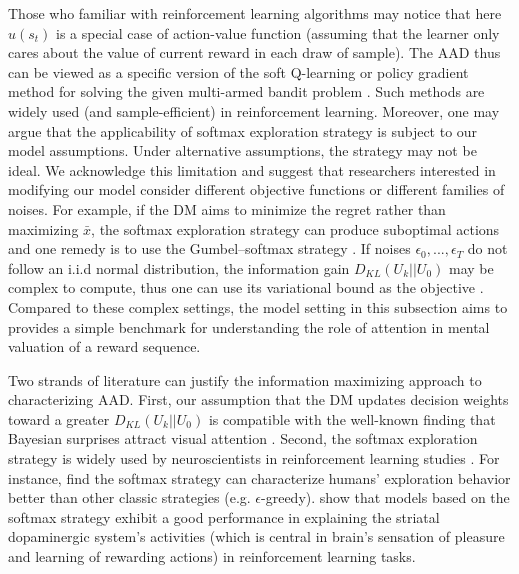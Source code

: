 \documentclass[
  12pt,
]{article}
\begin{document}
Those who familiar with reinforcement learning algorithms may notice
that here \(u(s_t)\) is a special case of action-value function
(assuming that the learner only cares about the value of current reward
in each draw of sample). The AAD thus can be viewed as a specific
version of the soft Q-learning or policy gradient method for solving the
given multi-armed bandit problem
\citep{haarnoja2017reinforcement, schulman2017equivalence}. Such methods
are widely used (and sample-efficient) in reinforcement learning.
Moreover, one may argue that the applicability of softmax exploration
strategy is subject to our model assumptions. Under alternative
assumptions, the strategy may not be ideal. We acknowledge this
limitation and suggest that researchers interested in modifying our
model consider different objective functions or different families of
noises. For example, if the DM aims to minimize the regret rather than
maximizing \(\bar{x}\), the softmax exploration strategy can produce
suboptimal actions and one remedy is to use the Gumbel--softmax strategy
\citep{cesa2017boltzmann}. If noises \(\epsilon_0,...,\epsilon_T\) do
not follow an i.i.d normal distribution, the information gain
\(D_{KL}(U_k||U_0)\) may be complex to compute, thus one can use its
variational bound as the objective \citep{houthooft2016vime}. Compared
to these complex settings, the model setting in this subsection aims to
provides a simple benchmark for understanding the role of attention in
mental valuation of a reward sequence.

Two strands of literature can justify the information maximizing
approach to characterizing AAD. First, our assumption that the DM
updates decision weights toward a greater \(D_{KL}(U_k||U_0)\) is
compatible with the well-known finding that Bayesian surprises attract
visual attention \citep{itti2009bayesian}. Second, the softmax
exploration strategy is widely used by neuroscientists in reinforcement
learning studies
\citep{daw2006cortical, niv2012neural, fitzgerald2012action, collins2014opponent, niv2015reinforcement, leong2017dynamic}.
For instance, \citet{daw2006cortical} find the softmax strategy can
characterize humans' exploration behavior better than other classic
strategies (e.g. \(\epsilon\)-greedy). \citet{collins2014opponent} show
that models based on the softmax strategy exhibit a good performance in
explaining the striatal dopaminergic system's activities (which is
central in brain's sensation of pleasure and learning of rewarding
actions) in reinforcement learning tasks.
\end{document}
